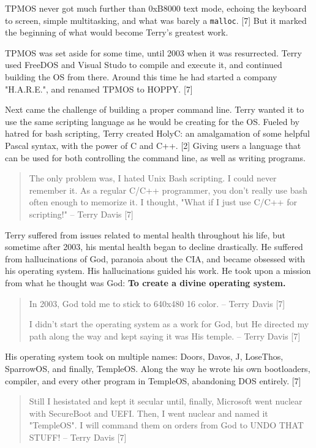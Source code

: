 \documentclass[11pt]{article}
\begin{document}
TPMOS never got much further than 0xB8000 text mode, echoing the keyboard to
screen, simple multitasking, and what was barely a \texttt{malloc}. [7] But it marked
the beginning of what would become Terry's greatest work.

TPMOS was set aside for some time, until 2003 when it was resurrected. Terry
used FreeDOS and Visual Studo to compile and execute it, and continued building
the OS from there. Around this time he had started a company "H.A.R.E.", and
renamed TPMOS to HOPPY. [7]

Next came the challenge of building a proper command line. Terry wanted it to
use the same scripting language as he would be creating for the OS. Fueled by
hatred for bash scripting, Terry created HolyC: an amalgamation of some helpful
Pascal syntax, with the power of C and C++. [2] Giving users a language that can
be used for both controlling the command line, as well as writing programs.

\begin{quote}
The only problem was, I hated Unix Bash scripting. I could never remember it. As
a regular C/C++ programmer, you don't really use bash often enough to memorize
it. I thought, "What if I just use C/C++ for scripting!" -- Terry Davis [7]
\end{quote}

 \newpage

Terry suffered from issues related to mental health throughout his life, but
sometime after 2003, his mental health began to decline drastically. He suffered
from hallucinations of God, paranoia about the CIA, and became obsessed with his
operating system. His hallucinations guided his work. He took upon a mission
from what he thought was God: \textbf{To create a divine operating system.}

\begin{quote}
In 2003, God told me to stick to 640x480 16 color. -- Terry Davis [7]

I didn't start the operating system as a work for God, but He directed my path
along the way and kept saying it was His temple. -- Terry Davis [7]
\end{quote}

His operating system took on multiple names: Doors, Davos, J, LoseThos,
SparrowOS, and finally, TempleOS. Along the way he wrote his own bootloaders,
compiler, and every other program in TempleOS, abandoning DOS entirely. [7]

\begin{quote}
Still I hesistated and kept it secular until, finally, Microsoft went nuclear
with SecureBoot and UEFI. Then, I went nuclear and named it "TempleOS". I will
command them on orders from God to UNDO THAT STUFF! -- Terry Davis [7]
\end{quote}
\end{document}
